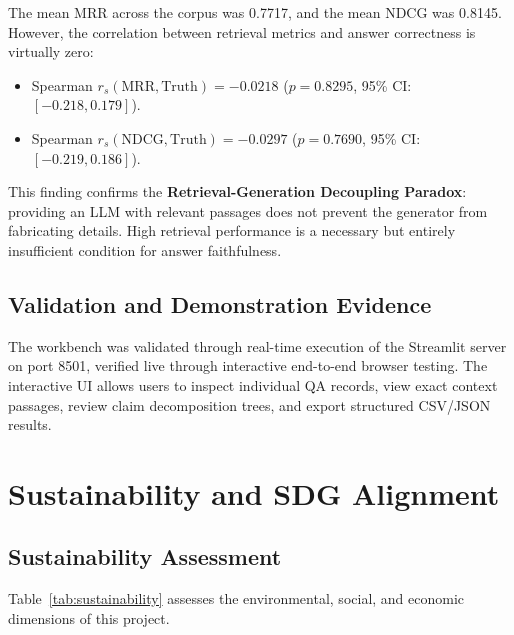 \documentclass[11pt,a4paper]{article}
\begin{document}
The mean MRR across the corpus was 0.7717, and the mean NDCG was 0.8145. However, the correlation between retrieval metrics and answer correctness is virtually zero:
\begin{itemize}[leftmargin=*]
    \item Spearman $r_s(\text{MRR}, \text{Truth}) = -0.0218$ ($p = 0.8295$, 95\% CI: $[-0.218, 0.179]$).
    \item Spearman $r_s(\text{NDCG}, \text{Truth}) = -0.0297$ ($p = 0.7690$, 95\% CI: $[-0.219, 0.186]$).
\end{itemize}

This finding confirms the \textbf{Retrieval-Generation Decoupling Paradox}: providing an LLM with relevant passages does not prevent the generator from fabricating details. High retrieval performance is a necessary but entirely insufficient condition for answer faithfulness.

\subsection{Validation and Demonstration Evidence}
The workbench was validated through real-time execution of the Streamlit server on port 8501, verified live through interactive end-to-end browser testing. The interactive UI allows users to inspect individual QA records, view exact context passages, review claim decomposition trees, and export structured CSV/JSON results.

\section{Sustainability and SDG Alignment}

\subsection{Sustainability Assessment}
Table~\ref{tab:sustainability} assesses the environmental, social, and economic dimensions of this project.
\end{document}
